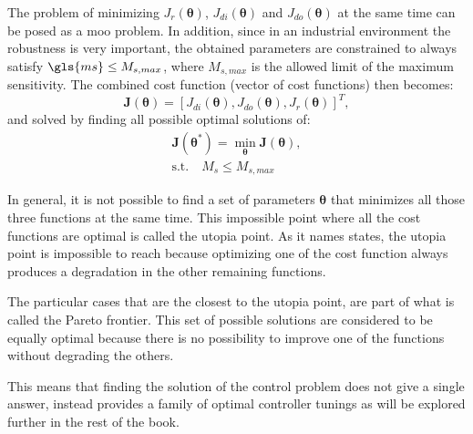 The problem of minimizing $J_r(\bm{\theta})$, $J_{di}(\bm{\theta})$ and $J_{do}(\bm{\theta})$ at the same time can be posed as a \gls{moo} problem. In addition, since in an industrial environment the robustness is very important, the obtained parameters are constrained to always satisfy  $\gls{ms} \leq M_{s,max}$, where $M_{s,max}$ is the allowed limit of the maximum sensitivity. The combined cost function (vector of cost functions) then becomes:
%
\begin{equation}  %
\textbf{J}(\bm{\theta})=\left[J_{di}(\bm{\theta}), J_{do}(\bm{\theta}), J_{r}(\bm{\theta})\right]^T,
\label{eq:Jtotal}
\end{equation}
%
and solved by finding all possible optimal solutions of:
%
\begin{equation}  %
\begin{gathered}
\textbf{J}(\bm{\theta}^*) = \min_{\bm{\theta}} \textbf{J}(\bm{\theta}),\\
\text{s.t.} \quad  M_s \leq M_{s,max}
\end{gathered}
\label{eq:probmoo}
\end{equation}

In general, it is not possible to find a set of parameters $\bm{\theta}$ that minimizes all those three functions at the same time. This impossible point where all the cost functions are optimal is called the utopia point. As it names states, the utopia point is impossible to reach because optimizing one of the cost function always produces a degradation in the other remaining functions.

The particular cases that are  the closest to the utopia point, are part of what is called the Pareto frontier. This set of possible solutions are considered to be equally optimal because there is no possibility to improve one of the functions without degrading the others.

This means that finding the solution of the control problem does not give a single answer, instead provides a family of optimal controller tunings as will be explored further in the rest of the book.

